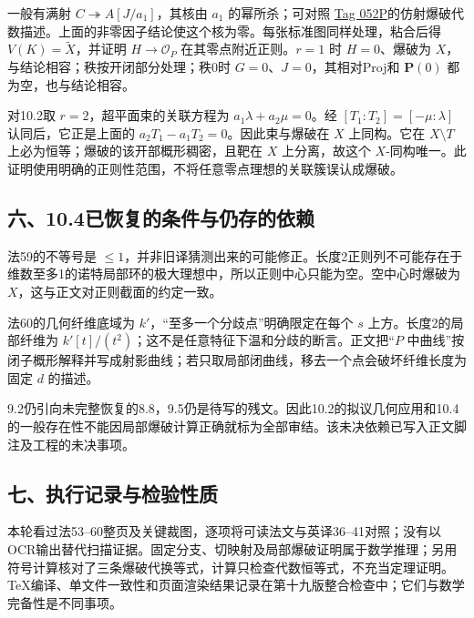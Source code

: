 一般有满射 $C\twoheadrightarrow A[J/a_1]$，其核由 $a_1$ 的幂所杀；可对照
\href{https://stacks.math.columbia.edu/tag/052P}{Tag 052P}的仿射爆破代数描述。上面的非零因子结论使这个核为零。每张标准图同样处理，粘合后得 $V(K)=\widetilde X$，并证明 $H\to\mathcal O_P$ 在其零点附近正则。$r=1$ 时 $H=0$、爆破为 $X$，与结论相容；秩按开闭部分处理；秩0时 $G=0$、$J=0$，其相对Proj和 $\mathbf P(0)$ 都为空，也与结论相容。

对10.2取 $r=2$，超平面束的关联方程为 $a_1\lambda+a_2\mu=0$。经 $[T_1:T_2]=[-\mu:\lambda]$ 认同后，它正是上面的 $a_2T_1-a_1T_2=0$。因此束与爆破在 $X$ 上同构。它在 $X\setminus T$ 上必为恒等；爆破的该开部概形稠密，且靶在 $X$ 上分离，故这个 $X$-同构唯一。此证明使用明确的正则性范围，不将任意零点理想的关联簇误认成爆破。

\subsection*{六、10.4已恢复的条件与仍存的依赖}
法59的不等号是 $\le1$，并非旧译猜测出来的可能修正。长度2正则列不可能存在于维数至多1的诺特局部环的极大理想中，所以正则中心只能为空。空中心时爆破为 $X$，这与正文对正则截面的约定一致。

法60的几何纤维底域为 $k'$，“至多一个分歧点”明确限定在每个 $s$ 上方。长度2的局部纤维为 $k'[t]/(t^2)$；这不是任意特征下温和分歧的断言。正文把“$P$ 中曲线”按闭子概形解释并写成射影曲线；若只取局部闭曲线，移去一个点会破坏纤维长度为固定 $d$ 的描述。

9.2仍引向未完整恢复的8.8，9.5仍是待写的残文。因此10.2的拟议几何应用和10.4的一般存在性不能因局部爆破计算正确就标为全部审结。该未决依赖已写入正文脚注及工程的未决事项。

\subsection*{七、执行记录与检验性质}
本轮看过法53--60整页及关键裁图，逐项将可读法文与英译36--41对照；没有以OCR输出替代扫描证据。固定分支、切映射及局部爆破证明属于数学推理；另用符号计算核对了三条爆破代换等式，计算只检查代数恒等式，不充当定理证明。TeX编译、单文件一致性和页面渲染结果记录在第十九版整合检查中；它们与数学完备性是不同事项。
\par\endgroup
